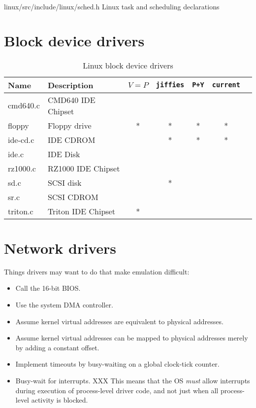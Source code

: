 \begin{csymlist}
\item[linux/src/include/linux/sched.h]	Linux task and scheduling declarations
\end{csymlist}


\section{Block device drivers}

\begin{table}
\begin{tabular}[c]{|l|l||c|c|c|c|c|}
\hline
Name	& Description			& $V=P$
					  & {\tt jiffies}
					    & {\tt P+Y}
					      & {\tt current}
					        &	\\
\hline
\hline
cmd640.c	& CMD640 IDE Chipset	& & & & &	\\\hline
floppy		& Floppy drive		&*&*&*&*&	\\\hline
ide-cd.c	& IDE CDROM		& &*&*&*&	\\\hline
ide.c		& IDE Disk		& & & & &	\\\hline
rz1000.c	& RZ1000 IDE Chipset	& & & &	&	\\\hline
sd.c		& SCSI disk		& &*& &	&	\\\hline
sr.c		& SCSI CDROM		& & & &	&	\\\hline
triton.c	& Triton IDE Chipset	&*& & &	&	\\\hline
\end{tabular}
\label{linux-block-drivers}
\caption{Linux block device drivers}
\end{table}

\section{Network drivers}

Things drivers may want to do
that make emulation difficult:
\begin{itemize}
\item	Call the 16-bit BIOS.
\item	Use the system DMA controller.
\item	Assume kernel virtual addresses are equivalent to physical addresses.
\item	Assume kernel virtual addresses can be mapped to physical addresses
	merely by adding a constant offset.
\item	Implement timeouts by busy-waiting on a global clock-tick counter.
\item	Busy-wait for interrupts.
	XXX This means that the OS \emph{must} allow interrupts
	during execution of process-level driver code,
	and not just when all process-level activity is blocked.
\end{itemize}

